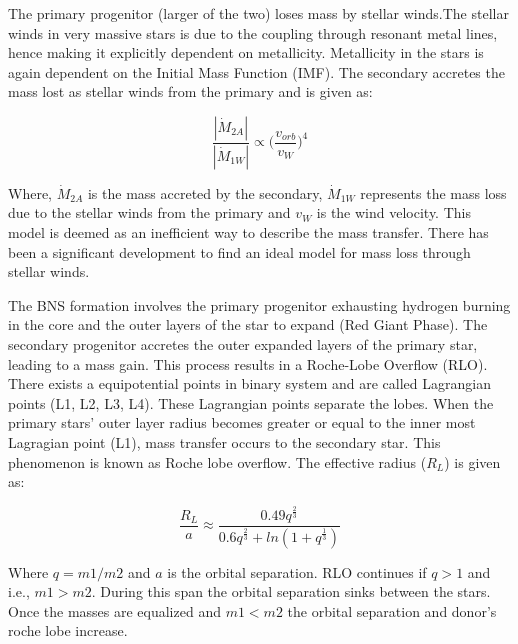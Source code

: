 \documentclass[preprint,12pt]{elsarticle}
\begin{document}
\newline
The primary progenitor (larger of the two) loses mass by stellar winds.The stellar winds in very massive stars is due to the coupling through resonant metal lines, hence making it explicitly dependent on metallicity. Metallicity in the stars is again dependent on the Initial Mass Function (IMF). The secondary accretes the mass lost as stellar winds from the primary and is given as\citep{Bondi:1944}:

\begin{equation}
    \frac{|\Dot{M}_{2A}|}{|\Dot{M}_{1W}|} \propto \Big(\frac{v_{orb}}{v_W}\Big)^4
\end{equation}

Where, $\Dot{M}_{2A}$ is the mass accreted by the secondary, $\Dot{M}_{1W}$ represents the mass loss due to the stellar winds from the primary and $v_W$ is the wind velocity. This model is deemed as an inefficient way to describe the mass transfer. There has been a significant development to find an ideal model for mass loss through stellar winds.\newline


\newline
The BNS formation involves the primary progenitor exhausting hydrogen burning in the core and the outer layers of the star to expand (Red Giant Phase). The secondary progenitor accretes the outer expanded layers of the primary star, leading to a mass gain. This process results in a Roche-Lobe Overflow (RLO). There exists a equipotential points in binary system and are called Lagrangian points (L1, L2, L3, L4). These Lagrangian points separate the lobes. When the primary stars' outer layer radius becomes greater or equal to the inner most Lagragian point (L1), mass transfer occurs to the secondary star. This phenomenon is known as Roche lobe overflow. The effective radius ($R_L$) is given as\citep{Eggleton:2006}:

\begin{equation}
    \frac{R_L}{a}\approx\frac{0.49q^\frac{2}{3}}{0.6q^\frac{2}{3}+ln(1+q^\frac{1}{3})}
\end{equation}

Where $q=m1/m2$ and $a$ is the orbital separation. RLO continues if $q>1$ and i.e., $m1>m2$. During this span the orbital separation sinks between the stars. Once the masses are equalized and $m1<m2$ the orbital separation and donor's roche lobe increase.\newline
\end{document}
